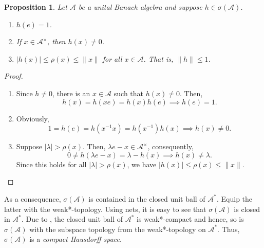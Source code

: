 \documentclass[11pt]{article}
\theoremstyle{thmstyle}
\newtheorem{proposition}[theorem]{Proposition}
\theoremstyle{defstyle}
\newcommand{\calA}{\mathcal{A}} %
\renewcommand{\le}{\leqslant}
\begin{document}
\begin{proposition}
    Let $\calA$ be a unital Banach algebra and suppose $h\in\sigma(\calA)$. 
    \begin{enumerate}[label=(\alph*)]
    \item $h(e) = 1$.
    \item If $x\in\calA^\times$, then $h(x)\ne 0$. 
    \item $|h(x)|\le\rho(x)\le\|x\|$ for all $x\in\calA$. That is, $\|h\|\le 1$.
    \end{enumerate}
\end{proposition}
\begin{proof}
\begin{enumerate}[label=(\alph*)]
    \item Since $h\ne 0$, there is an $x\in\calA$ such that $h(x)\ne 0$. Then, 
    \begin{equation*}
        h(x) = h(xe) = h(x)h(e)\implies h(e) = 1.
    \end{equation*}
    \item Obviously, 
    \begin{equation*}
        1 = h(e) = h(x^{-1}x) = h(x^{-1})h(x)\implies h(x)\ne 0.
    \end{equation*}
    \item Suppose $|\lambda| > \rho(x)$. Then, $\lambda e - x\in\calA^\times$, consequently, 
    \begin{equation*}
        0\ne h(\lambda e - x) = \lambda - h(x)\implies h(x)\ne\lambda.
    \end{equation*}
    Since this holds for all $|\lambda| > \rho(x)$, we have $|h(x)|\le\rho(x)\le\|x\|$.\qedhere
\end{enumerate}
\end{proof}

As a consequence, $\sigma(\calA)$ is contained in the closed unit ball of $\calA^\ast$. Equip the latter with the weak*-topology. Using nets, it is easy to see that $\sigma(\calA)$ is closed in $\calA^\ast$. Due to , the closed unit ball of $\calA^\ast$ is weak*-compact and hence, so is $\sigma(\calA)$ with the subspace topology from the weak*-topology on $\calA^\ast$. Thus, $\sigma(\calA)$ is a \emph{compact Hausdorff space}.
\end{document}
